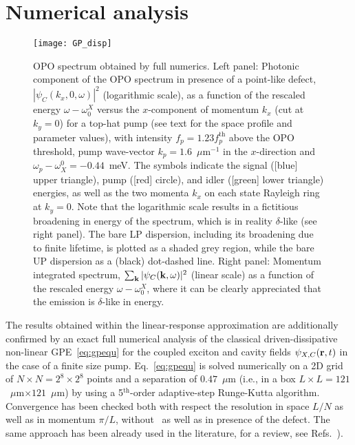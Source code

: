 \section{Numerical analysis}
\label{sec:numerical-analysis}
%
\begin{figure}[tb]\centering
\texttt{[image: GP\_disp]}
\caption{OPO spectrum obtained by full numerics. Left
  panel: Photonic component of the OPO spectrum in presence of a
  point-like defect, $|\psi_C(k_x,0,\omega)|^2$ (logarithmic scale),
  as a function of the rescaled energy $\omega - \omega_0^X$ versus
  the $x$-component of momentum $k_x$ (cut at $k_y=0$) for a top-hat
  pump (see text for the space profile and parameter values), with
  intensity $f_p=1.23 f_p^{\text{th}}$ above the OPO threshold, pump
  wave-vector $k_p=1.6$~$\mu$m$^{-1}$ in the $x$-direction and
  $\omega_p-\omega_X^0=-0.44$~meV. The symbols indicate the signal
  ([blue] upper triangle), pump ([red] circle), and idler ([green]
  lower triangle) energies, as well as the two momenta $k_x$ on each
  state Rayleigh ring at $k_y=0$. Note that the logarithmic scale
  results in a fictitious broadening in energy of the spectrum, which
  is in reality $\delta$-like (see right panel). The bare LP
  dispersion, including its broadening due to finite lifetime, is
  plotted as a shaded grey region, while the bare UP dispersion as a
  (black) dot-dashed line. Right panel: Momentum integrated spectrum,
  $\sum_{\mathbf{k}} |\psi_C(\mathbf{k},\omega)|^2$ (linear scale) as a
  function of the rescaled energy $\omega - \omega_0^X$, where it can
  be clearly appreciated that the emission is $\delta$-like in
  energy.}
\label{fig:spectGP}
\end{figure}
%
The results obtained within the linear-response approximation are
additionally confirmed by an exact full numerical analysis of the
classical driven-dissipative non-linear GPE~\eqref{eq:gpequ} for the
coupled exciton and cavity fields $\psi_{X,C} (\mathbf{r},t)$ in the case
of a finite size pump. Eq.~\eqref{eq:gpequ} is solved numerically on a
2D grid of $N\times N=2^8\times 2^8$ points and a separation of
$0.47$~$\mu$m (i.e., in a box $L\times L =
121$~$\mu$m$\times 121$~$\mu$m) by using a 5$^{\text{th}}$-order
adaptive-step Runge-Kutta algorithm. Convergence has been checked both
with respect the resolution in space $L/N$ as well as in momentum
$\pi/L$, without~\cite{Marchetti_2010,9783642241857} as well as in
presence of the defect.
%
The same approach has been already used in the literature, for a
review, see Refs.~\cite{Marchetti_2010,9783642241857}).

